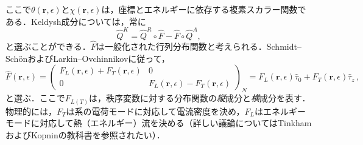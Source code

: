 \documentclass[a4paper,11pt]{ltjsarticle}
\begin{document}
ここで$\theta(\mathbf{r},\epsilon)$と$\chi(\mathbf{r},\epsilon)$は，座標とエネルギーに依存する複素スカラー関数である．Keldysh成分については，常に
\begin{equation}\label{SuperCond-Q-K}
\hat{Q}^{K}=\hat{Q}^{R}\circ\hat{F}-\hat{F}\circ\hat{Q}^{A},
\end{equation}
と選ぶことができる．$\hat{F}$は一般化された行列分布関数と考えられる．Schmidt--Sch\"{o}n\cite{SchmidtSchon}およびLarkin--Ovchinnikov\cite{LarkinOvchinnikov-F}に従って，
\begin{equation}\label{SuperCond-F}
\hat{F}(\mathbf{r},\epsilon)=\left(
\begin{array}{cc}
F_{L}(\mathbf{r},\epsilon)+F_{T}(\mathbf{r},\epsilon) & 0 \\ 0 &
F_{L}(\mathbf{r},\epsilon)-F_{T}(\mathbf{r},\epsilon)
\end{array}\right)_{N}=F_{L}(\mathbf{r},\epsilon)\hat{\tau}_{0}+
F_{T}(\mathbf{r},\epsilon)\hat{\tau}_{z}\,,
\end{equation}
と選ぶ．ここで$F_{L(T)}$は，秩序変数に対する分布関数の\textit{縦}成分と\textit{横}成分を表す．物理的には，$F_{T}$は系の電荷モードに対応して電流密度を決め，$F_{L}$はエネルギーモードに対応して熱（エネルギー）流を決める（詳しい議論についてはTinkham\cite{Tinkham}およびKopnin\cite{Kopnin}の教科書を参照されたい）．
\end{document}
